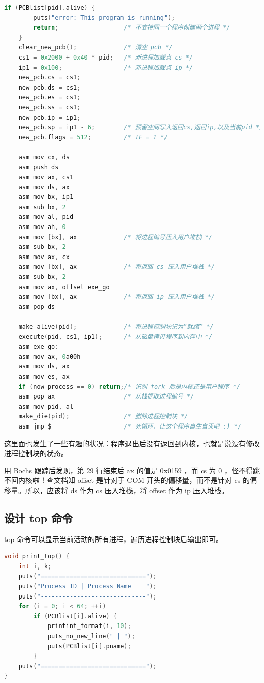 \documentclass{article}
\begin{document}
\begin{lstlisting}[language=C]
	if (PCBlist[pid].alive) {
		puts("error: This program is running");
		return;                  /* 不支持同一个程序创建两个进程 */
	}
	clear_new_pcb();             /* 清空 pcb */
	cs1 = 0x2000 + 0x40 * pid;   /* 新进程加载点 cs */
	ip1 = 0x100;                 /* 新进程加载点 ip */
	new_pcb.cs = cs1;
	new_pcb.ds = cs1;
	new_pcb.es = cs1;
	new_pcb.ss = cs1;
	new_pcb.ip = ip1;
	new_pcb.sp = ip1 - 6;        /* 预留空间写入返回cs,返回ip,以及当前pid */
	new_pcb.flags = 512;         /* IF = 1 */
	
	asm mov cx, ds
	asm push ds
	asm mov ax, cs1
	asm mov ds, ax
	asm mov bx, ip1
	asm sub bx, 2
	asm mov al, pid
	asm mov ah, 0
	asm mov [bx], ax             /* 将进程编号压入用户堆栈 */
	asm sub bx, 2
	asm mov ax, cx
	asm mov [bx], ax             /* 将返回 cs 压入用户堆栈 */
	asm sub bx, 2
	asm mov ax, offset exe_go
	asm mov [bx], ax             /* 将返回 ip 压入用户堆栈 */
	asm pop ds
	
	make_alive(pid);             /* 将进程控制块记为“就绪” */
	execute(pid, cs1, ip1);      /* 从磁盘拷贝程序到内存中 */
	asm exe_go:
	asm mov ax, 0a00h
	asm mov ds, ax
	asm mov es, ax
	if (now_process == 0) return;/* 识别 fork 后是内核还是用户程序 */
	asm pop ax                   /* 从栈提取进程编号 */
	asm mov pid, al
	make_die(pid);               /* 删除进程控制块 */
	asm jmp $                    /* 死循环，让这个程序自生自灭吧 :) */
\end{lstlisting}

这里面也发生了一些有趣的状况：程序退出后没有返回到内核，也就是说没有修改进程控制块的状态。

用 Bochs 跟踪后发现，第 29 行结束后 ax 的值是 0x0159 ，而 cs 为 0 ，怪不得跳不回内核啦！查文档知 offset 是针对于 COM 开头的偏移量，而不是针对 cs 的偏移量。所以，应该将 ds 作为 cs 压入堆栈，将 offset 作为 ip 压入堆栈。

\subsection{设计 top 命令}

top 命令可以显示当前活动的所有进程，遍历进程控制块后输出即可。

\begin{lstlisting}[language=C]
void print_top() {
	int i, k;
	puts("=============================");
	puts("Process ID | Process Name    ");
	puts("-----------------------------");
	for (i = 0; i < 64; ++i)
		if (PCBlist[i].alive) {
			printint_format(i, 10);
			puts_no_new_line(" | ");
			puts(PCBlist[i].pname);
		}
	puts("=============================");
}
\end{lstlisting}
\end{document}
